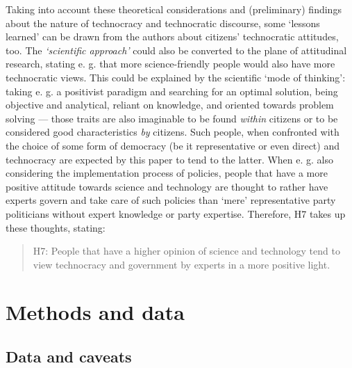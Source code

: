 \documentclass[
  12pt,
  english,
]{article}
\begin{document}
Taking into account these theoretical considerations and (preliminary)
findings about the nature of technocracy and technocratic discourse,
some `lessons learned' can be drawn from the authors about citizens'
technocratic attitudes, too. The \emph{`scientific approach'} could also
be converted to the plane of attitudinal research, stating e. g. that
more science-friendly people would also have more technocratic views.
This could be explained by the scientific `mode of thinking': taking e.
g. a positivist paradigm and searching for an optimal solution, being
objective and analytical, reliant on knowledge, and oriented towards
problem solving --- those traits are also imaginable to be found
\emph{within} citizens or to be considered good characteristics
\emph{by} citizens. Such people, when confronted with the choice of some
form of democracy (be it representative or even direct) and technocracy
are expected by this paper to tend to the latter. When e. g. also
considering the implementation process of policies, people that have a
more positive attitude towards science and technology are thought to
rather have experts govern and take care of such policies than `mere'
representative party politicians without expert knowledge or party
expertise. Therefore, H7 takes up these thoughts, stating:

\begin{quote}
H7: People that have a higher opinion of science and technology tend to
view technocracy and government by experts in a more positive light.
\end{quote}

\hypertarget{methods-and-data}{%
\section{Methods and data}\label{methods-and-data}}

\hypertarget{data-and-caveats}{%
\subsection{Data and caveats}\label{data-and-caveats}}
\end{document}
